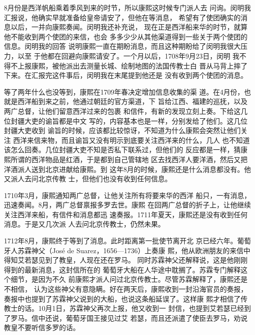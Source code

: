 8月份是西洋帆船乘着季风到来的时节，所以康熙这时候专门派人去%
问询。闵明我汇报说，他确实早就准备给皇帝请安了，但他在等消息，%
希望有了使团确实的消息以后，一并向康熙奏闻。闵明我还补充说，%
现在正是西洋船来华的时节，就算他不能收到两个使团的来信，也会%
多多少少从其他渠道得到一些关于两个使团的信息。闵明我的回答%
说明康熙一直在期盼消息，而且这种期盼给了闵明我很大压力，以至%
于他都在回避向康熙请安了。一个月以后，1708年9月23日，闵明%
我不得不上报康熙，被他派出去测量长城、绘制地图的法国传教士白%
晋从马背上摔了下来。在汇报完这件事后，闵明我在末尾提到他还是%
没有收到两个使团的消息。%
\par
等了两年什么也没等到，康熙在1709年春决定增加信息收集的渠%
道。在4月份，也就是西洋船到来之前，他通过朝廷的官方渠道，下%
旨给江西、福建的巡抚，以及两广总督，让他们留意西洋过来的包裹%
和信件，有新的发现立刻上奏。下给这几位封疆大吏的谕旨都是中文%
写的，内容基本也是一样，分别发给了他们。这几位封疆大吏收到%
谕旨的时候，应该都比较惊讶，不知道为什么康熙会突然让他们关注%
西洋来信来物，而且谕旨又没有明示到底要关注西洋来的什么，几人%
也不知道该怎么回奏。几位封疆大吏不知是否私下联系过，但他们的%
反应都是一样，猜康熙所谓的西洋物品是红酒，于是都到自己管辖地%
区去找西洋人要洋酒，然后又把洋酒派人送到北京进献给康熙。到%
这年8月的时候，康熙还是什么消息都没有。他又派人去问北京传教%
士，但他们也没有收到任何信息。%
\par
1710年3月，康熙通知两广总督，让他关注所有将要来华的西洋%
船只，一有消息，迅速奏闻。8月，两广总督禀报多罗去世。康熙%
在回两广总督的折子上，让他继续关注西洋来船，有信件和消息都迅%
速奏报。1711年夏天，康熙还是没有收到任何消息。于是又几次派%
人去问北京传教士，仍然未果。%
\par
1712年8月，康熙终于等到了消息。此时距离第一批使节离开北%
京已经六年。葡萄牙人苏霖神父（José de Suarez，1656—1736）上奏康%
熙，他从欧洲朋友的来信中得知艾若瑟见到了教皇，人现在还在罗马。%
同时苏霖神父还解释说，这是他刚刚得到的最新消息，这封信所在的%
葡萄牙大船在人华途中耽搁了。苏霖专门解释这个细节，是因为不久%
前康熙才派人问过北京传教士。尽管苏霖解释了，康熙还是不相信，%
认为这些神父有意隐瞒。好在两天后，康熙收到一封沿海官员的奏报，%
奏报中也提到了苏霖神父说到的大船，也说这条船延误了。这样康%
熙才相信了传教士的话。10月1日，苏霖神父再次上报，他又收到一%
封信，也提到艾若瑟已经到了罗马。信中还说，葡萄牙国王接见过艾%
若瑟，而且还派遣了使臣去罗马，劝说教皇不要听信多罗的话。%
